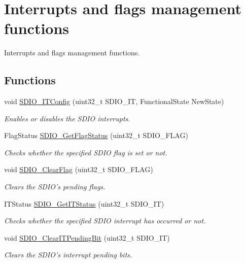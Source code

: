 \hypertarget{group___s_d_i_o___group7}{\section{Interrupts and flags management functions}
\label{group___s_d_i_o___group7}
}


Interrupts and flags management functions.  


\subsection*{Functions}
\begin{DoxyCompactItemize}
\item 
void \hyperlink{group___s_d_i_o___group7_ga208f51237ef43288735829dbaed37f00}{S\-D\-I\-O\-\_\-\-I\-T\-Config} (uint32\-\_\-t S\-D\-I\-O\-\_\-\-I\-T, Functional\-State New\-State)
\begin{DoxyCompactList}\small\item\em Enables or disables the S\-D\-I\-O interrupts. \end{DoxyCompactList}\item 
Flag\-Status \hyperlink{group___s_d_i_o___group7_ga644514b4b3c95c5c4326d99cd166f6f9}{S\-D\-I\-O\-\_\-\-Get\-Flag\-Status} (uint32\-\_\-t S\-D\-I\-O\-\_\-\-F\-L\-A\-G)
\begin{DoxyCompactList}\small\item\em Checks whether the specified S\-D\-I\-O flag is set or not. \end{DoxyCompactList}\item 
void \hyperlink{group___s_d_i_o___group7_ga7aff4efdeb528229135f9f285e53518a}{S\-D\-I\-O\-\_\-\-Clear\-Flag} (uint32\-\_\-t S\-D\-I\-O\-\_\-\-F\-L\-A\-G)
\begin{DoxyCompactList}\small\item\em Clears the S\-D\-I\-O's pending flags. \end{DoxyCompactList}\item 
I\-T\-Status \hyperlink{group___s_d_i_o___group7_ga2d64af1f3df0f99cb518f9a89bbd02ac}{S\-D\-I\-O\-\_\-\-Get\-I\-T\-Status} (uint32\-\_\-t S\-D\-I\-O\-\_\-\-I\-T)
\begin{DoxyCompactList}\small\item\em Checks whether the specified S\-D\-I\-O interrupt has occurred or not. \end{DoxyCompactList}\item 
void \hyperlink{group___s_d_i_o___group7_ga048e07fd86321cd01b2a22c071c3149b}{S\-D\-I\-O\-\_\-\-Clear\-I\-T\-Pending\-Bit} (uint32\-\_\-t S\-D\-I\-O\-\_\-\-I\-T)
\begin{DoxyCompactList}\small\item\em Clears the S\-D\-I\-O's interrupt pending bits. \end{DoxyCompactList}\end{DoxyCompactItemize}


